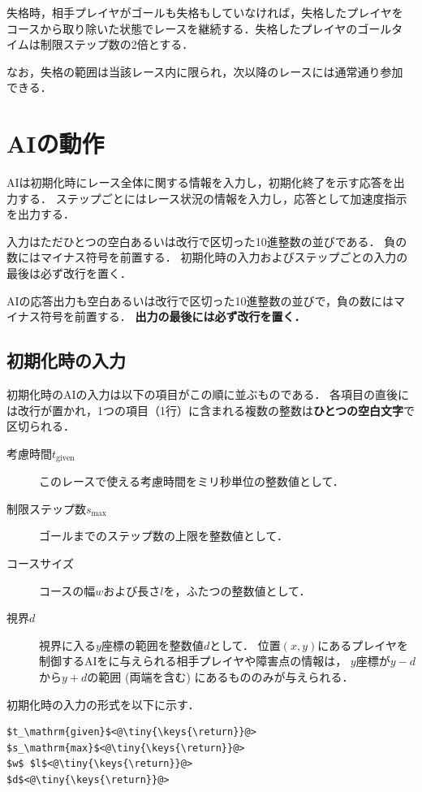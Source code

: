 \documentclass[11pt]{jarticle}
\begin{document}
失格時，相手プレイヤがゴールも失格もしていなければ，失格したプレイヤを
コースから取り除いた状態でレースを継続する．失格したプレイヤのゴールタ
イムは制限ステップ数の2倍とする．

なお，失格の範囲は当該レース内に限られ，次以降のレースには通常通り参加
できる．

\section{AIの動作}
AIは初期化時にレース全体に関する情報を入力し，初期化終了を示す応答を出
力する． ステップごとにはレース状況の情報を入力し，応答として加速度指示
を出力する．

入力はただひとつの空白あるいは改行で区切った10進整数の並びである．
負の数にはマイナス符号を前置する．
初期化時の入力およびステップごとの入力の最後は必ず改行を置く．

AIの応答出力も空白あるいは改行で区切った10進整数の並びで，負の数にはマ
イナス符号を前置する．  {\bf 出力の最後には必ず改行を置く．}

\subsection{初期化時の入力}
初期化時のAIの入力は以下の項目がこの順に並ぶものである．
各項目の直後には改行が置かれ，1つの項目（1行）に含まれる複数の整数は{\bf ひとつの空白文字}で区切られる．
\begin{description}
\item[考慮時間$t_\mathrm{given}$] このレースで使える考慮時間をミリ秒単位の整数値として．
\item[制限ステップ数$s_\mathrm{max}$] ゴールまでのステップ数の上限を整数値として．
\item[コースサイズ] コースの幅$w$および長さ$l$を，ふたつの整数値として．
\item[視界$d$] 視界に入る$y$座標の範囲を整数値$d$として．
  位置$(x,y)$にあるプレイヤを制御するAIをに与えられる相手プレイヤや障害点の情報は，
  $y$座標が$y-d$から$y+d$の範囲 (両端を含む) にあるもののみが与えられる．
\end{description}

\makeatletter
\def\lst@visiblespace{$\color{Gray}{}_{
  \mbox{\kern.06em\vrule \@height.3ex}%
  \vbox{\hrule \@width.3em}%
  \hbox{\vrule \@height.3ex}}$}
\makeatother


初期化時の入力の形式を以下に示す．
\begin{lstlisting}
$t_\mathrm{given}$<@\tiny{\keys{\return}}@>
$s_\mathrm{max}$<@\tiny{\keys{\return}}@>
$w$ $l$<@\tiny{\keys{\return}}@>
$d$<@\tiny{\keys{\return}}@>
\end{lstlisting}
\end{document}
